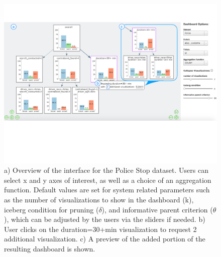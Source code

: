 \begin{figure}[ht!]
\centering
\includegraphics[width=0.95\linewidth,frame]{figures/overview_interface_expand.pdf}
\caption{a) Overview of the \system interface for the Police Stop dataset. Users can select x and y axes of interest, as well as a choice of an aggregation function. Default values are set for system related parameters such as the number of visualizations to show in the dashboard (k), iceberg condition for pruning ($\delta$), and informative parent criterion ($\theta$), which can be adjusted by the users via the sliders if needed. b) User clicks on the duration=30+min visualization to request 2 additional visualization. c) A preview of the added portion of the resulting dashboard is shown.}
\label{fig:overview}
\end{figure}
